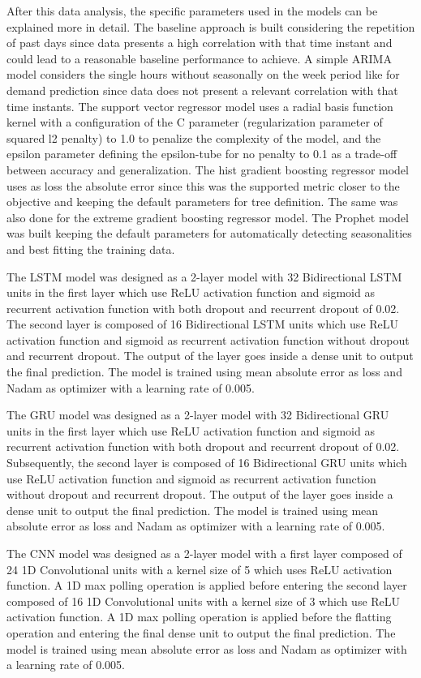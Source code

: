 After this data analysis, the specific parameters used in the models can be explained more in detail.
The baseline approach is built considering the repetition of past days since data presents a high correlation with that time instant and could lead to a reasonable baseline performance to achieve.
A simple ARIMA model considers the single hours without seasonally on the week period like for demand prediction since data does not present a relevant correlation with that time instants.
The support vector regressor model uses a radial basis function kernel with a configuration of the C parameter (regularization parameter of squared l2 penalty) to 1.0 to penalize the complexity of the model, and the epsilon parameter defining the epsilon-tube for no penalty to 0.1 as a trade-off between accuracy and generalization.
The hist gradient boosting regressor model uses as loss the absolute error since this was the supported metric closer to the objective and keeping the default parameters for tree definition.
The same was also done for the extreme gradient boosting regressor model.
The Prophet model was built keeping the default parameters for automatically detecting seasonalities and best fitting the training data.

The LSTM model was designed as a 2-layer model with 32 Bidirectional LSTM units in the first layer which use ReLU activation function and sigmoid as recurrent activation function with both dropout and recurrent dropout of 0.02.
The second layer is composed of 16 Bidirectional LSTM units which use ReLU activation function and sigmoid as recurrent activation function without dropout and recurrent dropout.
The output of the layer goes inside a dense unit to output the final prediction.
The model is trained using mean absolute error as loss and Nadam as optimizer with a learning rate of 0.005.

The GRU model was designed as a 2-layer model with 32 Bidirectional GRU units in the first layer which use ReLU activation function and sigmoid as recurrent activation function with both dropout and recurrent dropout of 0.02.
Subsequently, the second layer is composed of 16 Bidirectional GRU units which use ReLU activation function and sigmoid as recurrent activation function without dropout and recurrent dropout.
The output of the layer goes inside a dense unit to output the final prediction.
The model is trained using mean absolute error as loss and Nadam as optimizer with a learning rate of 0.005.

The CNN model was designed as a 2-layer model with a first layer composed of 24 1D Convolutional units with a kernel size of 5 which uses ReLU activation function.
A 1D max polling operation is applied before entering the second layer composed of 16 1D Convolutional units with a kernel size of 3 which use ReLU activation function.
A 1D max polling operation is applied before the flatting operation and entering the final dense unit to output the final prediction.
The model is trained using mean absolute error as loss and Nadam as optimizer with a learning rate of 0.005.

